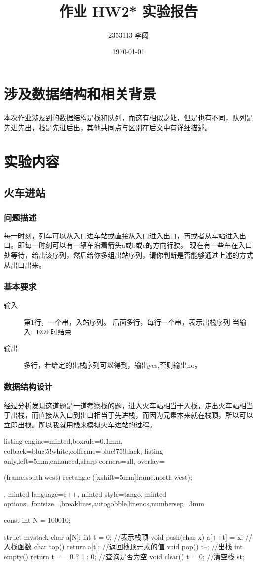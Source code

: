 \documentclass[12pt]{article}
\title{作业 HW2* 实验报告}
\author{2353113 李阔}
\date{\today}
\begin{document}
\maketitle
\section{涉及数据结构和相关背景}
{\songti 本次作业涉及到的数据结构是栈和队列，而这有相似之处，但是也有不同，队列是先进先出，栈是先进后出，其他共同点与区别在后文中有详细描述。}
\section{实验内容}
\subsection{火车进站}
\subsubsection{问题描述}
{\songti 每一时刻，列车可以从入口进车站或直接从入口进入出口，再或者从车站进入出口。即每一时刻可以有一辆车沿着箭头a或b或c的方向行驶。 现在有一些车在入口处等待，给出该序列，然后给你多组出站序列，请你判断是否能够通过上述的方式从出口出来。 }
\subsubsection{基本要求}

\begin{description}
    \item[输入] 第1行，一个串，入站序列。
后面多行，每行一个串，表示出栈序列
当输入=EOF时结束
    \item[输出] 多行，若给定的出栈序列可以得到，输出yes,否则输出no。
\end{description}
\subsubsection{数据结构设计}
{\songti 经过分析发现这道题是一道考察栈的题，进入火车站相当于入栈，走出火车站相当于出栈，而直接从入口到出口相当于先进栈，而因为元素本来就在栈顶，所以可以立即出栈。所以我就用栈来模拟火车进站的过程。}
\begin{tcblisting}{listing engine=minted,boxrule=0.1mm,
colback=blue!5!white,colframe=blue!75!black,
listing only,left=5mm,enhanced,sharp corners=all,
overlay={\begin{tcbclipinterior} (frame.south west)
rectangle ([xshift=5mm]frame.north west);\end{tcbclipinterior}},
minted language=c++,
minted style=tango,
minted options={fontsize=\small,breaklines,autogobble,linenos,numbersep=3mm}}
const int N = 100010;

struct mystack {
    char a[N];
    int t = 0;  //表示栈顶
    void push(char x) { a[++t] = x; }  //入栈函数
    char top() { return a[t]; }  //返回栈顶元素的值
    void pop() { t--; }   //出栈
    int empty() { return t == 0 ? 1 : 0; }  //查询是否为空
    void clear() { t = 0; }   //清空栈
} st;
\end{tcblisting}
\end{document}
